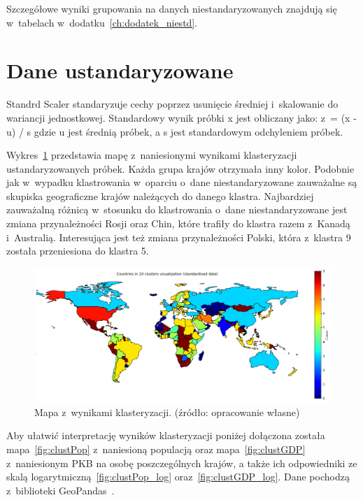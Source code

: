 \documentclass[11pt]{report}
\begin{document}
    Szczegółowe wyniki grupowania na danych niestandaryzowanych znajdują się w~tabelach w~dodatku~\ref{ch:dodatek_niestd}.


    \section{Dane ustandaryzowane}\label{sec:dane-ustandaryzowane}
    Standrd Scaler standaryzuje cechy poprzez usunięcie średniej i~skalowanie do wariancji jednostkowej.
    Standardowy wynik próbki x jest obliczany jako:
    z~= (x - u) / s
    gdzie u jest średnią próbek, a s jest standardowym odchyleniem próbek.

    Wykres~\ref{fig:clust10std} przedstawia mapę z~naniesionymi wynikami klasteryzacji ustandaryzowanych próbek.
    Każda grupa krajów otrzymała inny kolor.
    Podobnie jak w~wypadku klastrowania w~oparciu o~dane niestandaryzowane zauważalne są skupiska geograficzne krajów należących do danego klastra.
    Najbardziej zauważalną różnicą w~stosunku do klastrowania o~dane niestandaryzowane jest zmiana przynależności Rosji oraz Chin, które trafiły do klastra razem z~Kanadą i~Australią.
    Interesująca jest też zmiana przynależności Polski, która z~klastra 9 została przeniesiona do klastra 5.

    \begin{figure}[!htp]
        \centering
        \includegraphics[width=\linewidth]{fig/CLUST/10clusterMap_std.png}
        \caption{Mapa z~wynikami klasteryzacji. (źródło: opracowanie własne)}
        \label{fig:clust10std}
    \end{figure}

    Aby ułatwić interpretację wyników klasteryzacji poniżej dołączona została mapa~\ref{fig:clustPop} z~naniesioną populacją oraz mapa~\ref{fig:clustGDP} z~naniesionym PKB na osobę poszczególnych krajów, a także ich odpowiedniki ze skalą logarytmiczną~\ref{fig:clustPop_log} oraz~\ref{fig:clustGDP_log}.
    Dane pochodzą z~biblioteki GeoPandas~\cite{geopandas}.
\end{document}
